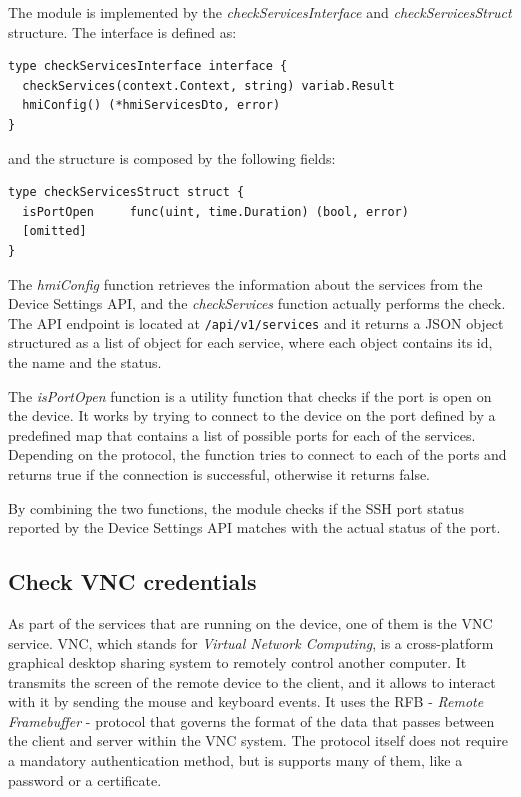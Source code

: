 The module is implemented by the \textit{checkServicesInterface} and \textit{checkServicesStruct} structure. The interface is defined as:

\begin{lstlisting}[style=golang]
type checkServicesInterface interface {
  checkServices(context.Context, string) variab.Result
  hmiConfig() (*hmiServicesDto, error)
}
\end{lstlisting}

and the structure is composed by the following fields:

\begin{lstlisting}[style=golang]
type checkServicesStruct struct {
  isPortOpen     func(uint, time.Duration) (bool, error)
  [omitted]
}
\end{lstlisting}

The \textit{hmiConfig} function retrieves the information about the services from the Device Settings API, and the \textit{checkServices} function actually performs the check. The API endpoint is located at \texttt{/api/v1/services} and it returns a JSON object structured as a list of object for each service, where each object contains its id, the name and the status.

The \textit{isPortOpen} function is a utility function that checks if the port is open on the device. It works by trying to connect to the device on the port defined by a predefined map that contains a list of possible ports for each of the services. Depending on the protocol, the function tries to connect to each of the ports and returns true if the connection is successful, otherwise it returns false.

By combining the two functions, the module checks if the SSH port status reported by the Device Settings API matches with the actual status of the port.

\subsection{Check VNC credentials}

As part of the services that are running on the device, one of them is the VNC service. VNC, which stands for \textit{Virtual Network Computing}, is a cross-platform graphical desktop sharing system to remotely control another computer. It transmits the screen of the remote device to the client, and it allows to interact with it by sending the mouse and keyboard events. It uses the RFB - \textit{Remote Framebuffer} - protocol that governs the format of the data that passes between the client and server within the VNC system. The protocol itself does not require a mandatory authentication method, but is supports many of them, like a password or a certificate.

